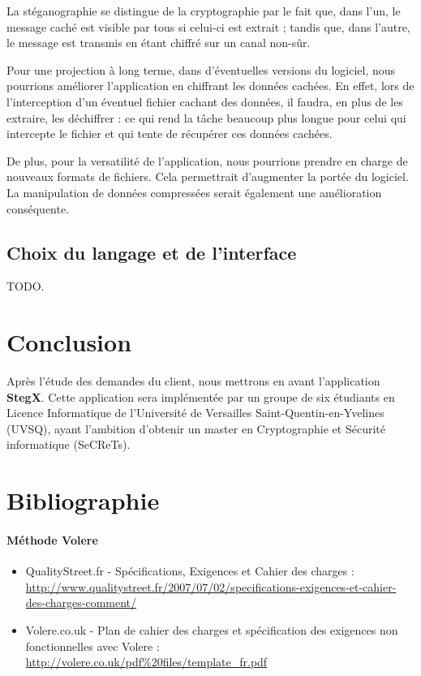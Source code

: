\documentclass[11pt]{article}
\begin{document}
La stéganographie se distingue de la cryptographie par le fait que, dans l'un,
le message caché est visible par tous si celui-ci est extrait ; tandis que, dans
l'autre, le message est transmis en étant chiffré sur un canal non-sûr. 

Pour une projection à long terme, dans d'éventuelles versions du logiciel, nous
pourrions améliorer l'application en chiffrant les données cachées. En effet,
lors de l'interception d'un éventuel fichier cachant des données, il faudra, en
plus de les extraire, les déchiffrer : ce qui rend la tâche beaucoup plus longue
pour celui qui intercepte le fichier et qui tente de récupérer ces données
cachées. 

De plus, pour la versatilité de l'application, nous pourrions prendre en charge
de nouveaux formats de fichiers. Cela permettrait d'augmenter la portée du
logiciel. La manipulation de données compressées serait également une
amélioration conséquente. 

\subsection{Choix du langage et de l'interface}

TODO.

\section{Conclusion}

Après l'étude des demandes du client, nous mettrons en avant l'application
\textbf{StegX}. Cette application sera implémentée par un groupe de six
étudiants en Licence Informatique de l'Université de Versailles
Saint-Quentin-en-Yvelines (UVSQ), ayant l'ambition d'obtenir un master en
Cryptographie et Sécurité informatique (SeCReTs). 

\section{Bibliographie}

\paragraph{Méthode Volere}
\begin{itemize}
\item QualityStreet.fr - Spécifications, Exigences et Cahier des charges : \\
    \url{http://www.qualitystreet.fr/2007/07/02/specifications-exigences-et-cahier-des-charges-comment/}
\item Volere.co.uk - Plan de cahier des charges et spécification des exigences
    non fonctionnelles avec Volere : \\
    \url{http://volere.co.uk/pdf%20files/template_fr.pdf}
\end{itemize}
\end{document}
